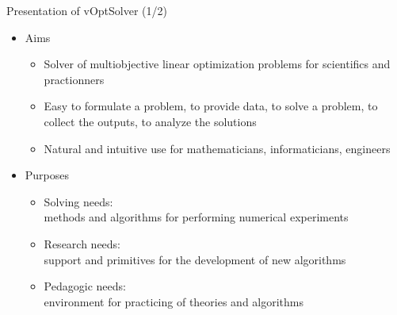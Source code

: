 \documentclass[10pt,xcolor=dvipsnames]{beamer}
\begin{document}
\begin{frame}{Presentation of vOptSolver (1/2)}

\begin{itemize}
\item Aims

\begin{itemize}
    \item Solver of multiobjective linear optimization problems for scientifics and practionners
    \item Easy to formulate a problem, to provide data, to solve a problem, to collect the outputs, to analyze the solutions
    \item Natural and intuitive use for mathematicians, informaticians, engineers
\end{itemize}
\medskip

\item Purposes

\begin{itemize}
    \item Solving needs:\\ methods and algorithms for performing numerical experiments
    \item Research needs:\\ support and primitives for the development of new algorithms
    \item Pedagogic needs:\\ environment for practicing of theories and algorithms
\end{itemize}

%
%
%

\end{itemize}

\end{frame}
\end{document}

